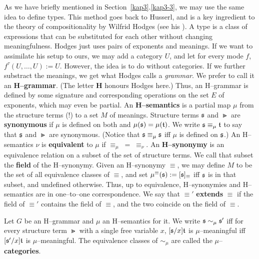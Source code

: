 As we have briefly mentioned in Section~\ref{kap3}.\ref{kap3-3}, we may use
the same idea to define types. This method goes back to Husserl,
and is a key ingredient to the theory of compositionality by
Wilfrid Hodges 
(see his ). A
type is a class of expressions that can be substituted for each other
without changing meaningfulness. Hodges just uses pairs of
exponents and meanings. If we want to assimilate his setup to
ours, we may add a category $U$, and let for every mode $f$,
$f^{\tau}(U, \dotsc, U) := U$. However, the idea is to do without
categories.  If we further substract the meanings, we get what
Hodges calls a {\it grammar}. We prefer to call it an 
\textbf{H--grammar}. (The letter \textbf{H} honours Hodges here.)
Thus, an H--grammar is defined by some signature and corresponding
operations on the set $E$ of exponents, which may even be partial.
An
\textbf{H--semantics} is a partial map $\mu$ from the structure terms
(!) to a set $M$ of meanings. Structure terms $\mathfrak{s}$ and $\Gt$ are
\textbf{synonymous} if $\mu$ is defined on both and $\mu(\mathfrak{s}) =
\mu(\mathfrak{t})$. We write $\mathfrak{s} \equiv_{\mu} \mathfrak{t}$ to say that $\mathfrak{s}$ and
$\Gt$ are synonymous. (Notice that $\mathfrak{s} \equiv_{\mu} \mathfrak{s}$ iff
$\mu$ is defined on $\mathfrak{s}$.) An H--semantics $\nu$ is
\textbf{equivalent} to $\mu$  if $\equiv_{\mu}\; =\; \equiv_{\nu}$.
An \textbf{H--synonymy} is an equivalence relation on a subset
of the set of structure terms. We call that subset the \textbf{field}
of the H--synonymy. Given an H--synonymy $\equiv$,
we may define $M$ to be the set of all equivalence classes
of $\equiv$, and set $\mu^{\equiv}(\mathfrak{s}) := [\mathfrak{s}]_{\equiv}$
iff $\mathfrak{s}$ is in that subset, and undefined otherwise.
Thus, up to equivalence, H--synonymies and H--semantics
are in one--to--one correspondence. We say that $\equiv'$
\textbf{extends} $\equiv$ if the field of $\equiv'$ contains the
field of $\equiv$, and the two coincide on the field of
$\equiv$.
\begin{defn}
Let $G$ be an H--grammar and $\mu$ an H--semantics for it. We
write $\mathfrak{s} \sim_{\mu} \mathfrak{s}'$ iff for every structure
term $\Gt$ with a single free variable $x$, $[\mathfrak{s}/x]\mathfrak{t}$ is
$\mu$--meaningful iff $[\mathfrak{s}'/x]\mathfrak{t}$ is
$\mu$--meaningful. The equivalence classes of $\sim_{\mu}$
are called the $\mu$--\textbf{categories}.
\end{defn}
